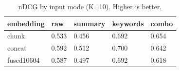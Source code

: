 \begin{table}
\caption{nDCG by input mode (K=10). Higher is better.}
\label{tab:ndcg-by-mode}
\begin{tabular}{lllll}
\toprule
embedding & raw & summary & keywords & combo \\
\midrule
chunk & 0.533 & 0.456 & 0.692 & 0.654 \\
concat & 0.592 & 0.512 & 0.700 & 0.642 \\
fused10604 & 0.587 & 0.497 & 0.692 & 0.618 \\
\bottomrule
\end{tabular}
\end{table}
